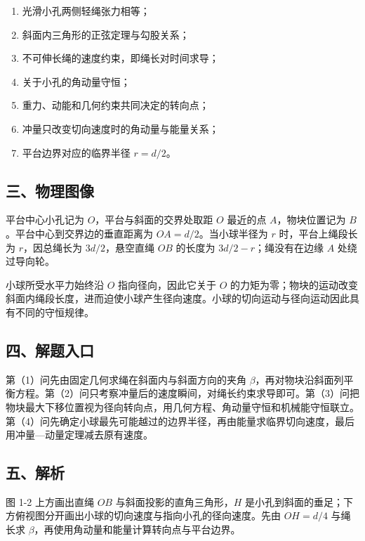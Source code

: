 \documentclass[12pt,a4paper,UTF8]{ctexart}
\newcommand{\tightlist}{\setlength{\itemsep}{0pt}\setlength{\parskip}{0pt}}
\begin{document}
\begin{enumerate}
\def\labelenumi{\arabic{enumi}.}
\tightlist
\item
  光滑小孔两侧轻绳张力相等；
\item
  斜面内三角形的正弦定理与勾股关系；
\item
  不可伸长绳的速度约束，即绳长对时间求导；
\item
  关于小孔的角动量守恒；
\item
  重力、动能和几何约束共同决定的转向点；
\item
  冲量只改变切向速度时的角动量与能量关系；
\item
  平台边界对应的临界半径 \(r=d/2\)。
\end{enumerate}

\subsection{三、物理图像}\label{ux4e09ux7269ux7406ux56feux50cf}

平台中心小孔记为 \(O\)，平台与斜面的交界处取距 \(O\) 最近的点
\(A\)，物块位置记为 \(B\)。平台中心到交界边的垂直距离为
\(OA=d/2\)。当小球半径为 \(r\) 时，平台上绳段长为 \(r\)，因总绳长为
\(3d/2\)，悬空直绳 \(OB\) 的长度为 \(3d/2-r\)；绳没有在边缘 \(A\)
处绕过导向轮。

小球所受水平力始终沿 \(O\) 指向径向，因此它关于 \(O\)
的力矩为零；物块的运动改变斜面内绳段长度，进而迫使小球产生径向速度。小球的切向运动与径向运动因此具有不同的守恒规律。

\subsection{四、解题入口}\label{ux56dbux89e3ux9898ux5165ux53e3}

第（1）问先由固定几何求绳在斜面内与斜面方向的夹角
\(\beta\)，再对物块沿斜面列平衡方程。第（2）问只考察冲量后的速度瞬间，对绳长约束求导即可。第（3）问把物块最大下移位置视为径向转向点，用几何方程、角动量守恒和机械能守恒联立。第（4）问先确定小球最先可能越过的边界半径，再由能量求临界切向速度，最后用冲量---动量定理减去原有速度。

\subsection{五、解析}\label{ux4e94ux89e3ux6790}

图 1-2 上方画出直绳 \(OB\) 与斜面投影的直角三角形，\(H\)
是小孔到斜面的垂足；下方俯视图分开画出小球的切向速度与指向小孔的径向速度。先由
\(OH=d/4\) 与绳长求 \(\beta\)，再使用角动量和能量计算转向点与平台边界。
\end{document}
